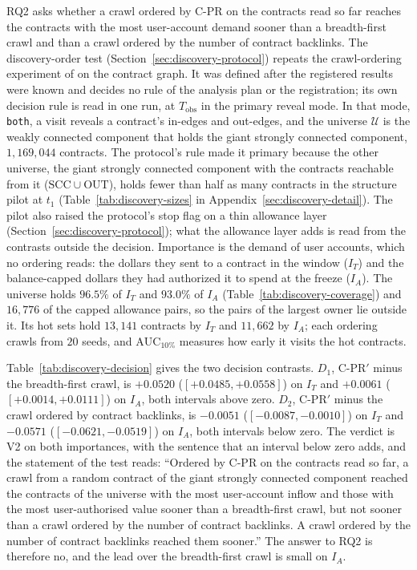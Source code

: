 
RQ2 asks whether a crawl ordered by \mbox{C-PR} on the contracts read so far reaches the contracts with the most user-account demand sooner than a breadth-first crawl and than a crawl ordered by the number of contract backlinks. The discovery-order test (Section~\ref{sec:discovery-protocol}) repeats the crawl-ordering experiment of \textcite{cho1998crawling} on the contract graph. It was defined after the registered results were known and decides no rule of the analysis plan or the registration; its own decision rule is read in one run, at $T_{\mathrm{obs}}$ in the primary reveal mode. In that mode, \texttt{both}, a visit reveals a contract's in-edges and out-edges, and the universe $\mathcal{U}$ is the weakly connected component that holds the giant strongly connected component, $1{,}169{,}044$ contracts. The protocol's rule made it primary because the other universe, the giant strongly connected component with the contracts reachable from it ($\mathrm{SCC}\cup\mathrm{OUT}$), holds fewer than half as many contracts in the structure pilot at $t_1$ (Table~\ref{tab:discovery-sizes} in Appendix~\ref{sec:discovery-detail}). The pilot also raised the protocol's stop flag on a thin allowance layer (Section~\ref{sec:discovery-protocol}); what the allowance layer adds is read from the contrasts outside the decision. Importance is the demand of user accounts, which no ordering reads: the dollars they sent to a contract in the window ($I_T$) and the balance-capped dollars they had authorized it to spend at the freeze ($I_A$). The universe holds $96.5\%$ of $I_T$ and $93.0\%$ of $I_A$ (Table~\ref{tab:discovery-coverage}) and $16{,}776$ of the capped allowance pairs, so the pairs of the largest owner lie outside it. Its hot sets hold $13{,}141$ contracts by $I_T$ and $11{,}662$ by $I_A$; each ordering crawls from $20$ seeds, and $\mathrm{AUC}_{10\%}$ measures how early it visits the hot contracts.

Table~\ref{tab:discovery-decision} gives the two decision contrasts. $D_1$, \mbox{C-PR}$'$ minus the breadth-first crawl, is $+0.0520$ ($[+0.0485,+0.0558]$) on $I_T$ and $+0.0061$ ($[+0.0014,+0.0111]$) on $I_A$, both intervals above zero. $D_2$, \mbox{C-PR}$'$ minus the crawl ordered by contract backlinks, is $-0.0051$ ($[-0.0087,-0.0010]$) on $I_T$ and $-0.0571$ ($[-0.0621,-0.0519]$) on $I_A$, both intervals below zero. The verdict is V2 on both importances, with the sentence that an interval below zero adds, and the statement of the test reads: ``Ordered by \mbox{C-PR} on the contracts read so far, a crawl from a random contract of the giant strongly connected component reached the contracts of the universe with the most user-account inflow and those with the most user-authorised value sooner than a breadth-first crawl, but not sooner than a crawl ordered by the number of contract backlinks. A crawl ordered by the number of contract backlinks reached them sooner.'' The answer to RQ2 is therefore no, and the lead over the breadth-first crawl is small on $I_A$.

